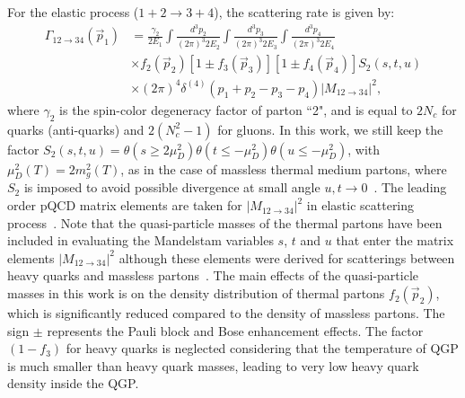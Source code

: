 \documentclass[aps,superscriptaddress,prc,twocolumn,nofootinbib]{revtex4}
\begin{document}
For the elastic process ($1+2 \rightarrow 3+4$), the scattering rate is given by:
\begin{align}
\label{eq:gamma0}
\Gamma_{12 \to 34} (\vec{p}_1)
& = \frac{\gamma_2}{2E_1} \int \frac{d^3 p_2}{(2\pi)^3 2E_2} \int \frac{d^3 p_3}{(2\pi)^3 2E_3}\int \frac{d^3 p_4}{(2\pi)^3 2E_4}
\nonumber\\
& \times f_2(\vec{p}_2)[1\pm f_3(\vec{p}_3)] [1\pm f_4(\vec{p}_4)] S_2(s,t,u)
\nonumber\\
& \times (2\pi)^4 \delta^{(4)} (p_1 + p_2 - p_3 -p_4)|M_{12 \rightarrow 34}|^2,
\end{align}
where $\gamma_2$ is the spin-color degeneracy factor of parton ``2",  and is equal to $ 2 N_c$ for quarks (anti-quarks) and  $ 2 (N_c^2-1)$ for gluons.
In this work, we still keep the factor $S_2(s,t,u)=\theta(s\geq 2 \mu_D^2)\theta(t \leq-\mu_D^2)\theta(u \leq-\mu_D^2)$, with $\mu_D^2(T) = 2m_g^2(T)$, as in the case of massless thermal medium partons, where $S_2$ is imposed to avoid possible divergence at small angle $u, t \rightarrow 0$~\cite{Auvinen:2009qm, He:2015pra}. The leading order pQCD matrix elements are taken for $|M_{12 \rightarrow 34}|^2$ in elastic scattering process~\cite{Combridge:1978kx}. Note that the quasi-particle masses of the thermal partons have been included in evaluating the Mandelstam variables $s$, $t$ and $u$ that enter the matrix elements $|M_{12 \rightarrow 34}|^2$ although these elements were derived for scatterings between heavy quarks and massless partons~\cite{Combridge:1978kx}. The main effects of the quasi-particle masses in this work is on the density distribution of thermal partons $f_2(\vec{p}_2)$, which is significantly reduced compared to the density of massless partons. The sign $\pm$ represents the Pauli block and Bose enhancement effects.
The factor $(1-f_3)$ for heavy quarks is neglected considering that the temperature of QGP is much smaller than heavy quark masses, leading to very low heavy quark density inside the QGP.
\end{document}
